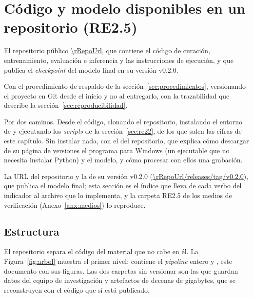 \section{Código y modelo disponibles en un repositorio (RE2.5)}
\label{sec:re25}

 El repositorio público \url{\rRepoUrl}, que contiene el
código de curación, entrenamiento, evaluación e inferencia y las instrucciones de
ejecución, y que publica el \textit{checkpoint} del modelo final en su versión
v0.2.0.

 Con el procedimiento de respaldo de la
sección~\ref{sec:procedimientos}, versionando el proyecto en Git desde el inicio
y no al entregarlo, con la trazabilidad que describe la
sección~\ref{sec:reproducibilidad}.

 Por dos caminos. Desde el código, clonando el
repositorio, instalando el entorno de  y ejecutando los
\textit{scripts} de la sección~\ref{sec:re22}, de los que salen las cifras de
este capítulo. Sin instalar
nada, con el  del repositorio, que explica cómo descargar de su
página de versiones el programa para Windows (un ejecutable que no necesita
instalar Python) y el modelo, y cómo procesar con ellos una grabación.

 La URL del repositorio y la de su versión
v0.2.0 (\url{\rRepoUrl/releases/tag/v0.2.0}), que publica el modelo final; esta
sección es el índice que lleva de cada verbo del indicador al archivo que lo
implementa, y la carpeta RE2.5 de los medios de verificación
(Anexo~\ref{anx:medios}) lo reproduce.

\subsection{Estructura}

El repositorio separa el código del material que no cabe en él. La
Figura~\ref{fig:arbol} muestra el primer nivel:  contiene el
\textit{pipeline} entero y , este documento con sus figuras. Las
dos carpetas sin versionar son las que guardan datos del equipo de investigación
y artefactos de decenas de gigabytes, que se reconstruyen con el código que sí
está publicado.

